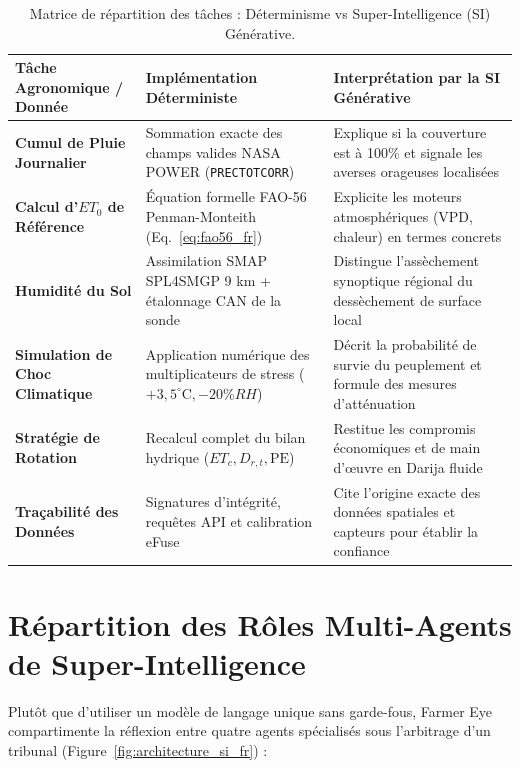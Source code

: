 \documentclass[11pt,a4paper,oneside]{report}
\begin{document}
\begin{table}[h!]
\centering
\small
\begin{tabularx}{\linewidth}{lXX}
\toprule
\textbf{Tâche Agronomique / Donnée} & \textbf{Implémentation Déterministe} & \textbf{Interprétation par la SI Générative} \\
\midrule
\textbf{Cumul de Pluie Journalier} & Sommation exacte des champs valides NASA POWER (\texttt{PRECTOTCORR}) & Explique si la couverture est à 100\% et signale les averses orageuses localisées \\
\textbf{Calcul d'$ET_0$ de Référence} & Équation formelle FAO-56 Penman-Monteith (Eq.~\ref{eq:fao56_fr}) & Explicite les moteurs atmosphériques (VPD, chaleur) en termes concrets \\
\textbf{Humidité du Sol} & Assimilation SMAP SPL4SMGP 9 km + étalonnage CAN de la sonde & Distingue l'assèchement synoptique régional du dessèchement de surface local \\
\textbf{Simulation de Choc Climatique} & Application numérique des multiplicateurs de stress ($+3,5^\circ\text{C}, -20\% RH$) & Décrit la probabilité de survie du peuplement et formule des mesures d'atténuation \\
\textbf{Stratégie de Rotation} & Recalcul complet du bilan hydrique ($ET_c, D_{r,t}, \text{PE}$) & Restitue les compromis économiques et de main d'œuvre en Darija fluide \\
\textbf{Traçabilité des Données} & Signatures d'intégrité, requêtes API et calibration eFuse & Cite l'origine exacte des données spatiales et capteurs pour établir la confiance \\
\bottomrule
\end{tabularx}
\caption{Matrice de répartition des tâches : Déterminisme vs Super-Intelligence (SI) Générative.}
\label{tab:deterministe_vs_si_fr}
\end{table}

\section{Répartition des Rôles Multi-Agents de Super-Intelligence}
Plutôt que d'utiliser un modèle de langage unique sans garde-fous, Farmer Eye compartimente la réflexion entre quatre agents spécialisés sous l'arbitrage d'un tribunal (Figure~\ref{fig:architecture_si_fr}) :
\end{document}
